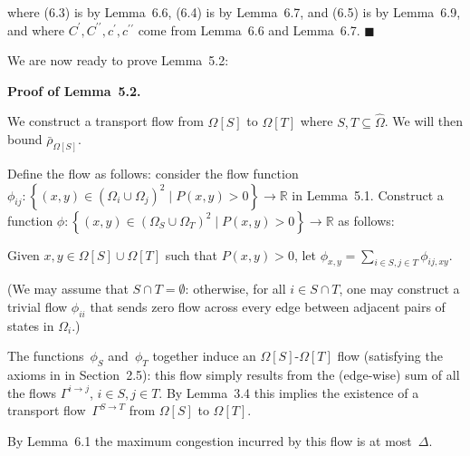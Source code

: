 where (6.3) is by Lemma 6.6, (6.4) is by Lemma 6.7, and (6.5) is by Lemma 6.9, and where $C^{\prime},C^{\prime\prime},c^{\prime},c^{\prime\prime}$ come from Lemma 6.6 and Lemma 6.7.
\ensuremath{\blacksquare}\par





We are now ready to prove Lemma 5.2:\par




\par\medskip\noindent\textbf{Proof of Lemma 5.2.}\par



We construct a transport flow from $\Omega[S]$ to $\Omega[T]$ where $S,T\subseteq\hat{\Omega}$. We will then bound $\bar{\rho}_{\Omega[S]}$.\par




Define the flow as follows: consider the flow function $\phi_{ij}:\left\{(x,y)\in(\Omega_{i}\cup\Omega_{j})^{2}\mid P(x,y)>0\right\}\rightarrow\mathbb{R}$ in Lemma 5.1. Construct a function $\phi:\left\{(x,y)\in(\Omega_{S}\cup\Omega_{T})^{2}\mid P(x,y)>0\right\}\rightarrow\mathbb{R}$ as follows:\par




Given $x,y\in\Omega[S]\cup\Omega[T]$ such that $P(x,y)>0$, let $\phi_{x,y}=\sum_{i\in S,j\in T}\phi_{ij,xy}$.\par




(We may assume that $S\cap T=\emptyset$: otherwise, for all $i\in S\cap T$, one may construct a trivial flow $\phi_{ii}$ that sends zero flow across every edge between adjacent pairs of states in $\Omega_{i}$.)\par




The functions $\phi_{S}$ and $\phi_{T}$ together induce an $\Omega[S]$-$\Omega[T]$ flow (satisfying the axioms in in Section 2.5): this flow simply results from the (edge-wise) sum of all the flows $\Gamma^{i\rightarrow j}$, $i\in S,j\in T$. By Lemma 3.4 this implies the existence of a transport flow $\Gamma^{S\rightarrow T}$ from $\Omega[S]$ to $\Omega[T]$.\par




By Lemma 6.1 the maximum congestion incurred by this flow is at most $\Delta$.\par




